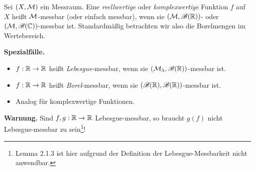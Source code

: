 \documentclass[
 a4paper,
 12pt,
 parskip=half
 ]{scrreprt}
\theoremstyle{plain}
\theoremstyle{definition}
\numberwithin{equation}{section}
\begin{document}
Sei $(X,\mathcal{M})$ ein Messraum. Eine \emph{reellwertige} oder \emph{komplexwertige} Funktion $f$ auf $X$ heißt $\mathcal{M}$-messbar (oder einfach messbar), wenn sie $(\mathcal{M},\mathscr{B}(\mathbb{R}))$- oder $(\mathcal{M},\mathscr{B}(\mathbb{C}))$-messbar ist. Standardmäßig betrachten wir also die Borelmengen im Wertebereich.

\textbf{Spezialfälle.}
\begin{itemize}
 \item $f: \mathbb{R} \to \mathbb{R}$ heißt \emph{Lebesgue}-messbar, wenn sie $(\mathcal{M}_\lambda, \mathscr{B}(\mathbb{R}))$-messbar ist.
 \item $f: \mathbb{R} \to \mathbb{R}$ heißt \emph{Borel}-messbar, wenn sie $(\mathscr{B}(\mathbb{R}), \mathscr{B}(\mathbb{R}))$-messbar ist.
 \item Analog für komplexwertige Funktionen.
\end{itemize}

\textbf{Warnung.}
Sind $f,g: \mathbb{R} \to \mathbb{R}$ Lebesgue-messbar, so braucht $g(f)$ nicht Lebesgue-messbar zu sein\footnote{Lemma 2.1.3 ist hier aufgrund der Definition der Lebesgue-Messbarkeit nicht anwendbar.}!
\end{document}
